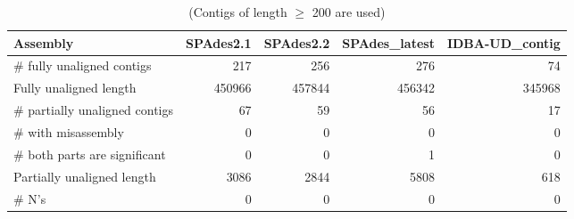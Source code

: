 \begin{table}[ht]
\begin{center}
\caption{(Contigs of length $\geq$ 200 are used)}
\begin{tabular}{|l*{4}{|r}|}
\hline
Assembly & SPAdes2.1 & SPAdes2.2 & SPAdes\_latest & IDBA-UD\_contig \\ \hline
\# fully unaligned contigs & 217 & 256 & 276 & 74 \\ \hline
Fully unaligned length & 450966 & 457844 & 456342 & 345968 \\ \hline
\# partially unaligned contigs & 67 & 59 & 56 & 17 \\ \hline
    \# with misassembly & 0 & 0 & 0 & 0 \\ \hline
    \# both parts are significant & 0 & 0 & 1 & 0 \\ \hline
Partially unaligned length & 3086 & 2844 & 5808 & 618 \\ \hline
\# N's & 0 & 0 & 0 & 0 \\ \hline
\end{tabular}
\end{center}
\end{table}
